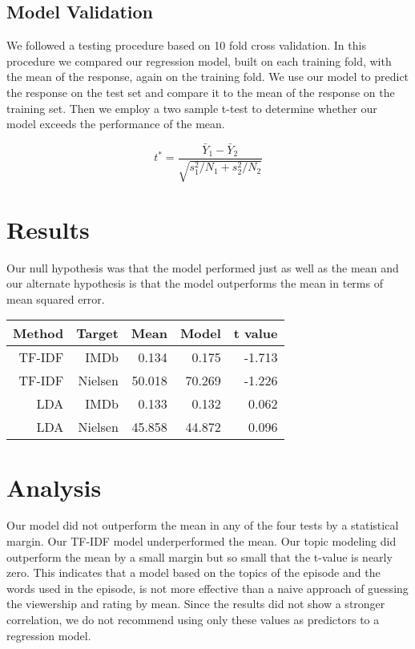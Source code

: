 \documentclass{sig-alternate-05-2015}
\begin{document}
\subsection{Model Validation}
We followed a testing procedure based on 10 fold cross validation. In this procedure we compared our regression model, built on each training fold, with the mean of the response, again on the training fold. We use our model to predict the response on the test set and compare it to the mean of the response on the training set. Then we employ a two sample t-test to determine whether our model exceeds the performance of the mean.

\begin{equation}
t^* = \frac{\bar{Y}_1 - \bar{Y}_2}{\sqrt{s_1^2/N_1 + s_2^2/N_2}}
\end{equation}

\section{Results}
Our null hypothesis was that the model performed just as well as the mean and our alternate hypothesis is that the model outperforms the mean in terms of mean squared error. 
\begin{center}
\begin{tabular}{|r | r || r | r | r|} \hline
Method & Target & Mean & Model & t value \\ \hline\hline
 TF-IDF & IMDb & 0.134 & 0.175 & -1.713 \\ \hline
 TF-IDF & Nielsen & 50.018 & 70.269 & -1.226 \\ \hline \hline
LDA & IMDb & 0.133 & 0.132 & 0.062 \\ \hline
LDA & Nielsen & 45.858 & 44.872 & 0.096 \\ \hline
\end{tabular}
\end{center}

\section{Analysis}

Our model did not outperform the mean in any of the four tests by a statistical margin. Our TF-IDF model underperformed the mean. Our topic modeling did outperform the mean by a small margin but so small that the t-value is nearly zero. This indicates that a model based on the topics of the episode and the words used in the episode, is not more effective than a naive approach of guessing the viewership and rating by mean. Since the results did not show a stronger correlation, we do not recommend using only these values as predictors to a regression model.
\end{document}
